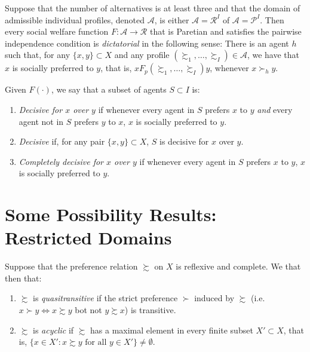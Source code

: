 \begin{prop}
    Suppose that the number of alternatives is at least three and that the domain of admissible individual profiles, denoted $\mathscr{A}$, is either $\mathscr{A} = \mathscr{R}^I$ of $\mathscr{A} = \mathscr{P}^I$. Then every social welfare function $F : \mathscr{A} \to \mathscr{R}$ that is Paretian and satisfies the pairwise independence condition is \emph{dictatorial} in the following sense: There is an agent $h$ such that, for any $\{x, y\} \subset X$ and any profile $(\succsim_1, \dots, \succsim_I) \in \mathscr{A}$, we have that $x$ is socially preferred to $y$, that is, $x F_p (\succsim_1, \dots, \succsim_I) y$, whenever $x \succ_h y$.
\end{prop}

\begin{defn}
    Given $F(\cdot)$, we say that a subset of agents $S \subset I$ is:
    \begin{enumerate}
        \item \emph{Decisive for $x$ over $y$} if whenever every agent in $S$ prefers $x$ to $y$ \emph{and} every agent not in $S$ prefers $y$ to $x$, $x$ is socially preferred to $y$.
        \item \emph{Decisive} if, for any pair $\{x, y\} \subset X$, $S$ is decisive for $x$ over $y$.
        \item \emph{Completely decisive for $x$ over $y$} if whenever every agent in $S$ prefers $x$ to $y$, $x$ is socially preferred to $y$.
    \end{enumerate}
\end{defn}


\section{Some Possibility Results: Restricted Domains}

\begin{defn}
    Suppose that the preference relation $\succsim$ on $X$ is reflexive and complete. We that then that:
    \begin{enumerate}
        \item $\succsim$ is \emph{quasitransitive} if the strict preference $\succ$ induced by $\succsim$ (i.e. $x \succ y \iff x \succsim y$ bot not $y \succsim x$) is transitive.
        \item $\succsim$ is \emph{acyclic} if $\succsim$ has a maximal element in every finite subset $X' \subset X$, that is, $\{x \in X' : x \succsim y \text{ for all } y \in X'\} \neq \emptyset$.
    \end{enumerate}
\end{defn}


